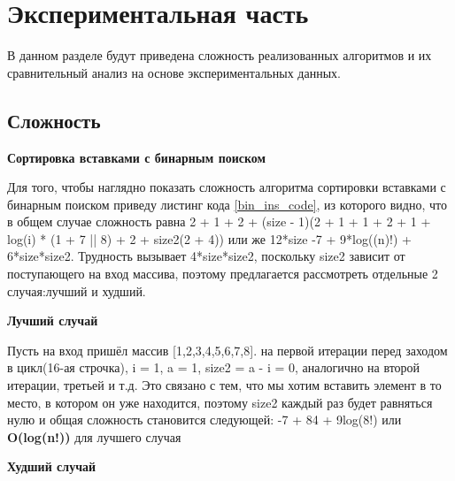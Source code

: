 \documentclass[a4paper, 14pt]{article}
\begin{document}
    \newpage
	\section{Экспериментальная часть}
	\hspace{1cm}В данном разделе будут приведена сложность реализованных алгоритмов и их сравнительный анализ на основе экспериментальных данных.
	\subsection{Сложность}
        
        \begin{doublespace}
        \large
        \textbf{Сортировка вставками с бинарным поиском}
        \normalsize
        \end{doublespace}
        
        \hspace{1cm}Для того, чтобы наглядно показать сложность алгоритма сортировки вставками с бинарным поиском приведу листинг кода \ref{bin_ins_code}, из которого видно, что в общем случае сложность равна 2 + 1 + 2 + (size - 1)(2 + 1 + 1 + 2 + 1 + log(i) * (1 + 7 || 8) + 2 + size2(2 + 4)) или же
        12*size -7 + 9*log((n)!) + 6*size*size2. Трудность вызывает 4*size*size2, поскольку size2 зависит от поступающего на вход массива, поэтому предлагается рассмотреть отдельные 2 случая:лучший и худший.
       
        \begin{doublespace}
        \large
        \textbf{Лучший случай}
        \normalsize
        \end{doublespace}
        
        Пусть на вход пришёл массив [1,2,3,4,5,6,7,8]. на первой итерации перед заходом в цикл(16-ая строчка), i = 1, a = 1, size2 = a - i = 0, аналогично на второй итерации, третьей и т.д. Это связано с тем, что мы хотим вставить элемент в то место, в котором он уже находится, поэтому size2 каждый раз будет равняться нулю
    	и общая сложность становится следующей: -7 + 84 + 9log(8!) или \textbf{O(log(n!))} для лучшего случая
    	
    	 \begin{doublespace}
        \large
        \textbf{Худший случай}
        \normalsize
        \end{doublespace}
        
\end{document}
